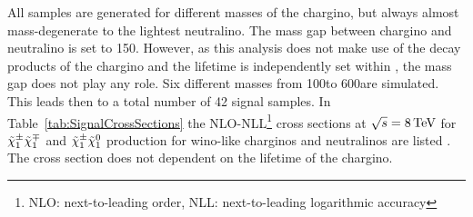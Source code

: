 All samples are generated for different masses of the chargino, but always almost mass-degenerate to the lightest neutralino.
The mass gap between chargino and neutralino is set to 150\mev.
However, as this analysis does not make use of the decay products of the chargino and the lifetime is independently set within \geant, the mass gap does not play any role.
Six different masses from 100\gev to 600\gev are simulated.
This leads then to a total number of 42 signal samples.
In Table~\ref{tab:SignalCrossSections} the NLO-NLL\footnote{NLO: next-to-leading order, NLL: next-to-leading logarithmic accuracy} cross sections at $\sqrt{s}=8\,\text{Te}\kern-0.06667em\text{V}$ for $\tilde{\chi}^{\pm}_{1}\tilde{\chi}^{\mp}_{1}$ and $\tilde{\chi}^{\pm}_{1}\tilde{\chi}^{0}_{1}$ production 
for wino-like charginos and neutralinos are listed \cite{bib:SignalCrossSection_2012,bib:SignalCrossSection_2013}.
The cross section does not dependent on the lifetime of the chargino.
\renewcommand{\arraystretch}{1.5}
\begin{table}[h]
\centering
\caption{Simulated signal mass points with corresponding cross sections for wino-like charginos.}
\label{tab:SignalCrossSections}
\end{table}  

